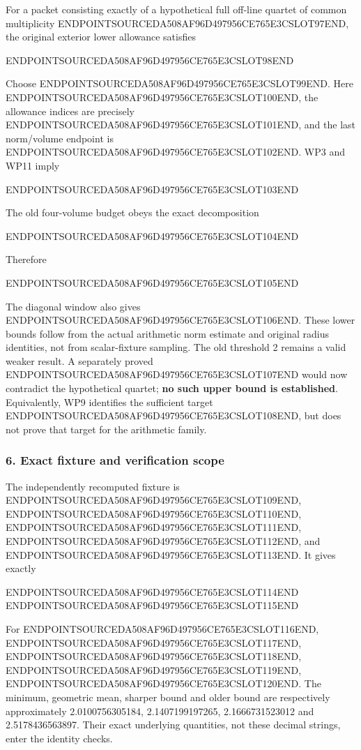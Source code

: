 For a packet consisting exactly of a hypothetical full off-line quartet of common multiplicity ENDPOINTSOURCEDA508AF96D497956CE765E3CSLOT97END, the original exterior lower allowance satisfies

ENDPOINTSOURCEDA508AF96D497956CE765E3CSLOT98END

Choose ENDPOINTSOURCEDA508AF96D497956CE765E3CSLOT99END. Here ENDPOINTSOURCEDA508AF96D497956CE765E3CSLOT100END, the allowance indices are precisely ENDPOINTSOURCEDA508AF96D497956CE765E3CSLOT101END, and the last norm/volume endpoint is ENDPOINTSOURCEDA508AF96D497956CE765E3CSLOT102END. WP3 and WP11 imply

ENDPOINTSOURCEDA508AF96D497956CE765E3CSLOT103END

The old four-volume budget obeys the exact decomposition

ENDPOINTSOURCEDA508AF96D497956CE765E3CSLOT104END

Therefore

ENDPOINTSOURCEDA508AF96D497956CE765E3CSLOT105END

The diagonal window also gives ENDPOINTSOURCEDA508AF96D497956CE765E3CSLOT106END. These lower bounds follow from the actual arithmetic norm estimate and original radius identities, not from scalar-fixture sampling. The old threshold 2 remains a valid weaker result. A separately proved ENDPOINTSOURCEDA508AF96D497956CE765E3CSLOT107END would now contradict the hypothetical quartet; \textbf{no such upper bound is established}. Equivalently, WP9 identifies the sufficient target ENDPOINTSOURCEDA508AF96D497956CE765E3CSLOT108END, but does not prove that target for the arithmetic family.

\subsubsection{6. Exact fixture and verification scope}\label{endpoint-window_product_owner--exact-fixture-and-verification-scope}

The independently recomputed fixture is ENDPOINTSOURCEDA508AF96D497956CE765E3CSLOT109END, ENDPOINTSOURCEDA508AF96D497956CE765E3CSLOT110END, ENDPOINTSOURCEDA508AF96D497956CE765E3CSLOT111END, ENDPOINTSOURCEDA508AF96D497956CE765E3CSLOT112END, and ENDPOINTSOURCEDA508AF96D497956CE765E3CSLOT113END. It gives exactly

ENDPOINTSOURCEDA508AF96D497956CE765E3CSLOT114END ENDPOINTSOURCEDA508AF96D497956CE765E3CSLOT115END

For ENDPOINTSOURCEDA508AF96D497956CE765E3CSLOT116END, ENDPOINTSOURCEDA508AF96D497956CE765E3CSLOT117END, ENDPOINTSOURCEDA508AF96D497956CE765E3CSLOT118END, ENDPOINTSOURCEDA508AF96D497956CE765E3CSLOT119END, ENDPOINTSOURCEDA508AF96D497956CE765E3CSLOT120END. The minimum, geometric mean, sharper bound and older bound are respectively approximately 2.0100756305184, 2.1407199197265, 2.1666731523012 and 2.5178436563897. Their exact underlying quantities, not these decimal strings, enter the identity checks.

